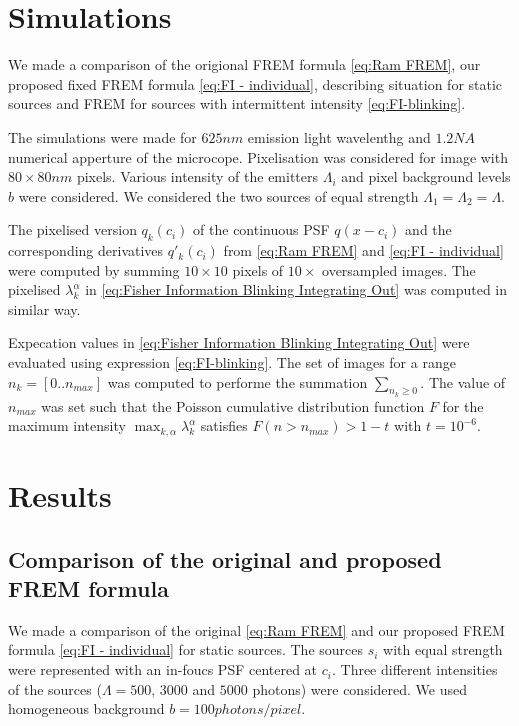 
\section{Simulations\label{sec:FREM simulations}} 
We made a comparison of the origional FREM formula \autoref{eq:Ram FREM}, our proposed fixed FREM formula \autoref{eq:FI - individual}, describing situation for static sources and FREM for sources with intermittent intensity \autoref{eq:FI-blinking}.

The simulations were made for $625\unit{nm}$ emission light wavelenthg and $1.2\unit{NA}$ numerical apperture of the microcope. Pixelisation was considered for image with $80\times80\unit{nm}$ pixels. Various intensity of the emitters $\Lambda_i$ and pixel background levels $b$ were considered. We considered the two sources of equal strength $\Lambda_1=\Lambda_2=\Lambda$.

The pixelised version $q_k(c_i)$ of the continuous PSF $q(x-c_i)$ and the corresponding derivatives $q'_k(c_i)$ from \autoref{eq:Ram FREM} and \autoref{eq:FI - individual} were computed by summing $10\times10$ pixels of $10\times$ oversampled images. The pixelised $\lambda^\alpha_k$ in \autoref{eq:Fisher Information Blinking Integrating Out} was computed in similar way. 

Expecation values in \autoref{eq:Fisher Information Blinking Integrating Out} were evaluated using expression \autoref{eq:FI-blinking}. The set of images for a range $n_k=[0..n_{max}]$ was computed to performe the summation $\sum_{n_k\geq0}$. The value of $n_{max}$ was set such that the Poisson cumulative distribution function $F$ for the maximum intensity $\max_{k,\alpha}\lambda_k^\alpha$ satisfies $F(n>n_{max})>1-t$ with $t=10^{-6}$. 


\section{Results\label{sec:FREM results}}

\subsection{Comparison of the original and proposed FREM formula}
We made a comparison of the original \autoref{eq:Ram FREM} and our proposed FREM formula \autoref{eq:FI - individual} for static sources. The sources $s_i$ with equal strength were represented with an in-foucs PSF centered at $c_i$.  Three different intensities of the sources ($\Lambda=500,\,3000$ and $5000$ photons) were considered. We used homogeneous background $b=100\unit{photons/pixel}$. 

